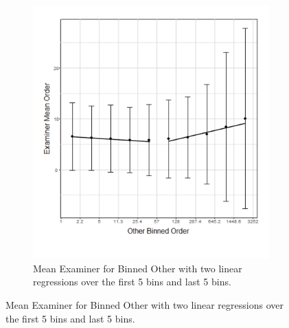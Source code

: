 \begin{figure}
\centering
\begin{subfigure}{0.6\linewidth}
  \centering
  \includegraphics[width=0.9\linewidth]{Figures/MeanExaminerVsOther}
  \caption[]{\small Mean Examiner for Binned Other with two linear regressions over the first 5 bins and last 5 bins.}
\label{fig:MeanExaminerVsOther}
\end{subfigure}


\end{figure}

